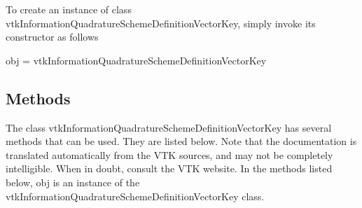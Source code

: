 To create an instance of class vtk\-Information\-Quadrature\-Scheme\-Definition\-Vector\-Key, simply invoke its constructor as follows \begin{DoxyVerb}  obj = vtkInformationQuadratureSchemeDefinitionVectorKey
\end{DoxyVerb}
 \hypertarget{vtkwidgets_vtkxyplotwidget_Methods}{}\subsection{Methods}\label{vtkwidgets_vtkxyplotwidget_Methods}
The class vtk\-Information\-Quadrature\-Scheme\-Definition\-Vector\-Key has several methods that can be used. They are listed below. Note that the documentation is translated automatically from the V\-T\-K sources, and may not be completely intelligible. When in doubt, consult the V\-T\-K website. In the methods listed below, {\ttfamily obj} is an instance of the vtk\-Information\-Quadrature\-Scheme\-Definition\-Vector\-Key class. 

